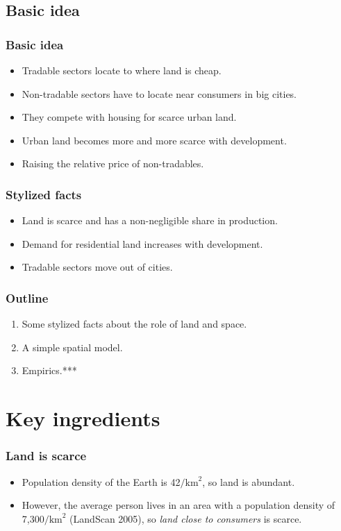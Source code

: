 \documentclass[handout,compress,mathserif]{beamer}
\begin{document}


\subsection{Basic idea}
\begin{frame}\frametitle{Basic idea}
\begin{itemize}
    \item Tradable sectors locate to where land is cheap.
    \item Non-tradable sectors have to locate near consumers in big cities.
    \item They compete with housing for scarce urban land.
    \item Urban land becomes more and more scarce with development.
    \item Raising the relative price of non-tradables.
\end{itemize}
\end{frame}

\begin{frame}\frametitle{Stylized facts}
\begin{itemize}
    \item Land is scarce and has a non-negligible share in production.
    \item Demand for residential land increases with development.
    \item Tradable sectors move out of cities.
\end{itemize}
\end{frame}


\begin{frame}\frametitle{Outline}
\begin{enumerate}
    \item Some stylized facts about the role of land and space.
    \item A simple spatial model.
    \item Empirics.***
\end{enumerate}
\end{frame}


\section{Key ingredients}
\begin{frame}\frametitle{Land is scarce}
\begin{itemize}
    \item Population density of the Earth is 42$/\text{km}^2$, so land is abundant.
    \pause
    \item However, the average person lives in an area with a population density of 7,300$/\text{km}^2$ (LandScan 2005),
    so \emph{land close to consumers} is scarce.
\end{itemize}
\end{frame}
\end{document}

